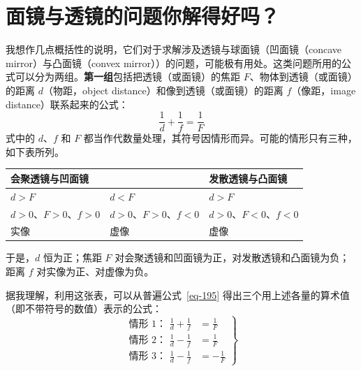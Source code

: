 

\chapter[面镜与透镜的问题你解得好吗？]{面镜与透镜的问题你解得好吗？\label{ch-33}}

\begin{dialogue}

\tchr 我想作几点概括性的说明，它们对于求解涉及透镜与球面镜（凹面镜（concave mirror）与凸面镜（convex mirror））的问题，可能极有用处。这类问题所用的公式可以分为两组。\textbf{第一组}包括把透镜（或面镜）的焦距 $F$、物体到透镜（或面镜）的距离 $d$（物距，object distance）和像到透镜（或面镜）的距离 $f$（像距，image distance）联系起来的公式：
\begin{equation}%
\frac{1}{d}+\frac{1}{f} = \frac{1}{F}
\label{eq-195}
\end{equation}
式中的 $d$、$f$ 和 $F$ 都当作代数量处理，其符号因情形而异。可能的情形只有三种，如下表所列。
\begin{table}
\begin{small}
\begin{tabular}{p{3.25cm}p{3.25cm}p{4.75cm}}
\toprule%
\multicolumn{2}{l}{会聚透镜与凹面镜} & 发散透镜与凸面镜\\
\midrule%
$d > F$ & $d<F$ & $d > F$\\
$d > 0$、$F > 0$、$f > 0$ & $d>0$、$F>0$、$f<0$ & $d > 0$、$F < 0$、$f < 0$\\
实像 & 虚像 & 虚像\\
\bottomrule%
\end{tabular}
\end{small}
\end{table}
于是，$d$ 恒为正；焦距 $F$ 对会聚透镜和凹面镜为正，对发散透镜和凸面镜为负；距离 $f$ 对实像为正、对虚像为负。

\stda 据我理解，利用这张表，可以从普遍公式~\eqref{eq-195} 得出三个用上述各量的算术值（即不带符号的数值）表示的公式：
\begin{equation}
\left. \begin{aligned}
\text{情形 1：}\,\, \frac{1}{d} + \frac{1}{f} &  = \frac{1}{F} \\
\text{情形 2：}\,\, \frac{1}{d}-\frac{1}{f} & = \frac{1}{F} \\
\text{情形 3：}\,\, \frac{1}{d}-\frac{1}{f} & = -\frac{1}{F}
\label{eq-196}
\end{aligned}
\right\}
\end{equation}


\end{dialogue}
